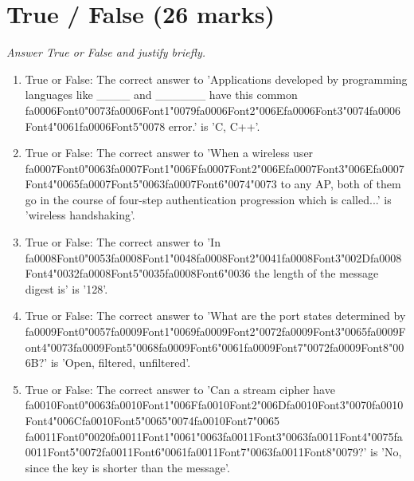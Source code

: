 \documentclass[12pt]{article}
\begin{document}
\section*{True / False (26 marks)}
\textit{Answer True or False and justify briefly.}
\begin{enumerate}[label=\arabic*.]
\item True or False: The correct answer to 'Applications developed by programming languages like \_\_\_\_ and \_\_\_\_\_\_ have this common {\csname fa0006Font0\endcsname\char"0073}{\csname fa0006Font1\endcsname\char"0079}{\csname fa0006Font2\endcsname\char"006E}{\csname fa0006Font3\endcsname\char"0074}{\csname fa0006Font4\endcsname\char"0061}{\csname fa0006Font5\endcsname\char"0078} error.' is 'C, C++'.
\item True or False: The correct answer to 'When a wireless user {\csname fa0007Font0\endcsname\char"0063}{\csname fa0007Font1\endcsname\char"006F}{\csname fa0007Font2\endcsname\char"006E}{\csname fa0007Font3\endcsname\char"006E}{\csname fa0007Font4\endcsname\char"0065}{\csname fa0007Font5\endcsname\char"0063}{\csname fa0007Font6\endcsname\char"0074}{\char"0073} to any AP, both of them go in the course of four-step authentication progression which is called...' is 'wireless handshaking'.
\item True or False: The correct answer to 'In {\csname fa0008Font0\endcsname\char"0053}{\csname fa0008Font1\endcsname\char"0048}{\csname fa0008Font2\endcsname\char"0041}{\csname fa0008Font3\endcsname\char"002D}{\csname fa0008Font4\endcsname\char"0032}{\csname fa0008Font5\endcsname\char"0035}{\csname fa0008Font6\endcsname\char"0036} the length of the message digest is' is '128'.
\item True or False: The correct answer to 'What are the port states determined by {\csname fa0009Font0\endcsname\char"0057}{\csname fa0009Font1\endcsname\char"0069}{\csname fa0009Font2\endcsname\char"0072}{\csname fa0009Font3\endcsname\char"0065}{\csname fa0009Font4\endcsname\char"0073}{\csname fa0009Font5\endcsname\char"0068}{\csname fa0009Font6\endcsname\char"0061}{\csname fa0009Font7\endcsname\char"0072}{\csname fa0009Font8\endcsname\char"006B}?' is 'Open, filtered, unfiltered'.
\item True or False: The correct answer to 'Can a stream cipher have {\csname fa0010Font0\endcsname\char"0063}{\csname fa0010Font1\endcsname\char"006F}{\csname fa0010Font2\endcsname\char"006D}{\csname fa0010Font3\endcsname\char"0070}{\csname fa0010Font4\endcsname\char"006C}{\csname fa0010Font5\endcsname\char"0065}{\char"0074}{\csname fa0010Font7\endcsname\char"0065} {\csname fa0011Font0\endcsname\char"0020}{\csname fa0011Font1\endcsname\char"0061}{\char"0063}{\csname fa0011Font3\endcsname\char"0063}{\csname fa0011Font4\endcsname\char"0075}{\csname fa0011Font5\endcsname\char"0072}{\csname fa0011Font6\endcsname\char"0061}{\csname fa0011Font7\endcsname\char"0063}{\csname fa0011Font8\endcsname\char"0079}?' is 'No, since the key is shorter than the message'.

\end{enumerate}
\end{document}
